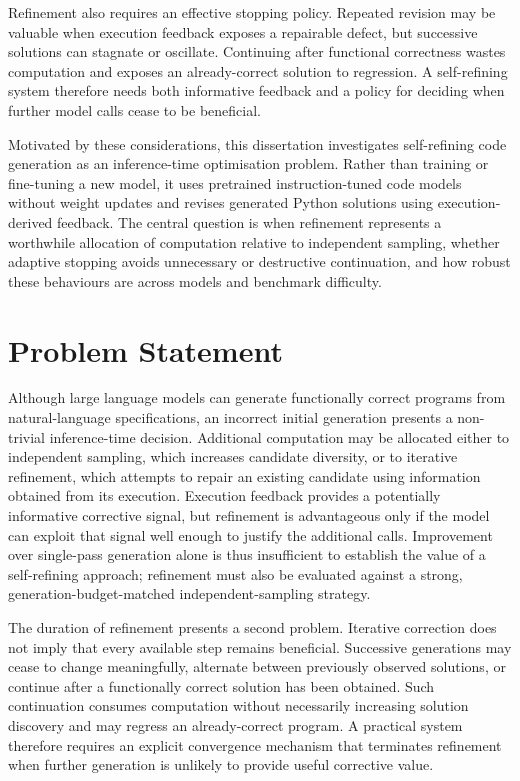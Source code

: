Refinement also requires an effective stopping policy. Repeated revision may be valuable when execution feedback exposes a repairable defect, but successive solutions can stagnate or oscillate. Continuing after functional correctness wastes computation and exposes an already-correct solution to regression. A self-refining system therefore needs both informative feedback and a policy for deciding when further model calls cease to be beneficial.

Motivated by these considerations, this dissertation investigates self-refining code generation as an inference-time optimisation problem. Rather than training or fine-tuning a new model, it uses pretrained instruction-tuned code models without weight updates and revises generated Python solutions using execution-derived feedback. The central question is when refinement represents a worthwhile allocation of computation relative to independent sampling, whether adaptive stopping avoids unnecessary or destructive continuation, and how robust these behaviours are across models and benchmark difficulty.

\section{Problem Statement}

Although large language models can generate functionally correct programs from natural-language specifications, an incorrect initial generation presents a non-trivial inference-time decision. Additional computation may be allocated either to independent sampling, which increases candidate diversity, or to iterative refinement, which attempts to repair an existing candidate using information obtained from its execution. Execution feedback provides a potentially informative corrective signal, but refinement is advantageous only if the model can exploit that signal well enough to justify the additional calls. Improvement over single-pass generation alone is thus insufficient to establish the value of a self-refining approach; refinement must also be evaluated against a strong, generation-budget-matched independent-sampling strategy.

The duration of refinement presents a second problem. Iterative correction does not imply that every available step remains beneficial. Successive generations may cease to change meaningfully, alternate between previously observed solutions, or continue after a functionally correct solution has been obtained. Such continuation consumes computation without necessarily increasing solution discovery and may regress an already-correct program. A practical system therefore requires an explicit convergence mechanism that terminates refinement when further generation is unlikely to provide useful corrective value.

